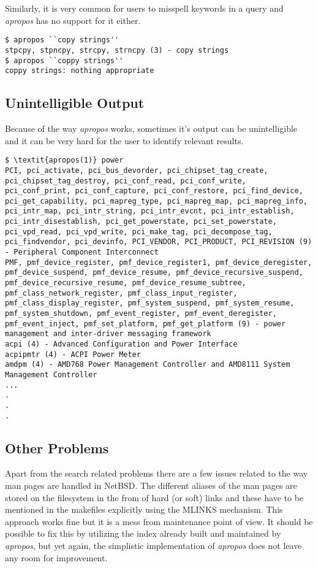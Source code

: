\documentclass[titlepage, a4paper, 12pt]{article}
\begin{document}
Similarly, it is very common for users to misspell keywords in a query and \textit{apropos} has no support for it either.
\begin{lstlisting}
$ apropos ``copy strings''
stpcpy, stpncpy, strcpy, strncpy (3) - copy strings
$ apropos ``coppy strings''
coppy strings: nothing appropriate
\end{lstlisting}

\subsection{Unintelligible Output}
Because of the way \textit{apropos} works, sometimes it's output can be
unintelligible and it can be very hard for the user to identify relevant results.

\begin{lstlisting}
$ \textit{apropos(1)} power
PCI, pci_activate, pci_bus_devorder, pci_chipset_tag_create,
pci_chipset_tag_destroy, pci_conf_read, pci_conf_write,
pci_conf_print, pci_conf_capture, pci_conf_restore, pci_find_device,
pci_get_capability, pci_mapreg_type, pci_mapreg_map, pci_mapreg_info,
pci_intr_map, pci_intr_string, pci_intr_evcnt, pci_intr_establish,
pci_intr_disestablish, pci_get_powerstate, pci_set_powerstate,
pci_vpd_read, pci_vpd_write, pci_make_tag, pci_decompose_tag,
pci_findvendor, pci_devinfo, PCI_VENDOR, PCI_PRODUCT, PCI_REVISION (9)
- Peripheral Component Interconnect
PMF, pmf_device_register, pmf_device_register1, pmf_device_deregister,
pmf_device_suspend, pmf_device_resume, pmf_device_recursive_suspend,
pmf_device_recursive_resume, pmf_device_resume_subtree,
pmf_class_network_register, pmf_class_input_register,
pmf_class_display_register, pmf_system_suspend, pmf_system_resume,
pmf_system_shutdown, pmf_event_register, pmf_event_deregister,
pmf_event_inject, pmf_set_platform, pmf_get_platform (9) - power
management and inter-driver messaging framework
acpi (4) - Advanced Configuration and Power Interface
acpipmtr (4) - ACPI Power Meter
amdpm (4) - AMD768 Power Management Controller and AMD8111 System
Management Controller
...
.
.
.
\end{lstlisting}
\subsection{Other Problems}
Apart from the search related problems there are a few issues related to
the way man pages are handled in NetBSD. The different aliases of the man pages
are stored on the filesystem in the from of hard (or soft) links and these
have to be mentioned in the makefiles explicitly using the MLINKS mechanism. This
approach works fine but it is a mess from maintenance point of view.
It should be possible to fix this by utilizing the index already built and
maintained by \textit{apropos}, but yet again, the simplistic implementation of
\textit{apropos} does not leave any room for improvement.
\end{document}
